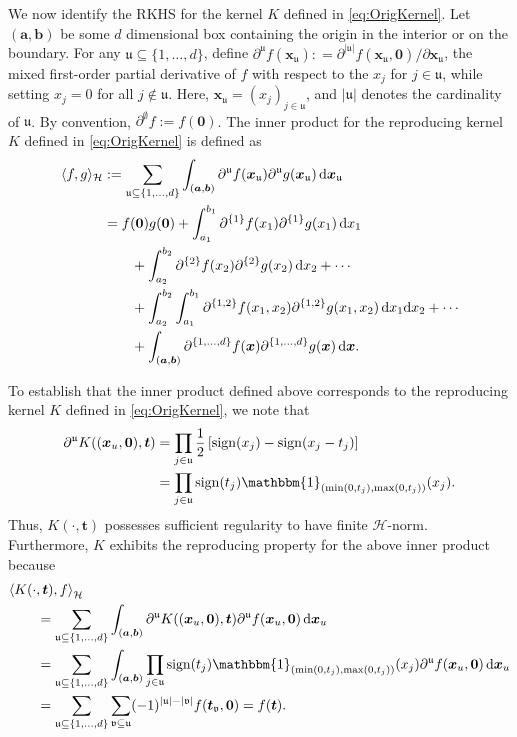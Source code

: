 \documentclass[graybox]{svmult}
\newcommand{\va}{\boldsymbol{a}}
\newcommand{\vb}{\boldsymbol{b}}
\newcommand{\vx}{\boldsymbol{x}}
\newcommand{\vt}{\boldsymbol{t}}
\newcommand{\fraku}{\mathfrak{u}}
\newcommand{\frakv}{\mathfrak{v}}
\newcommand{\vzero}{\boldsymbol{0}}
\newcommand{\dif}{{\rm d}}
\DeclareMathOperator{\sign}{sign}
\newcommand{\ch}{\mathcal{H}}
\newcommand{\bbone}{\mathbbm{1}}
\begin{document}
We now identify the RKHS for the kernel $K$ defined in \eqref{eq:OrigKernel}. Let $(\va,\vb)$ be some $d$ dimensional box containing the origin in the interior or on the boundary. For any $\fraku \subseteq \{1, \ldots, d\}$, define $\partial^\fraku f(\vx_\fraku) : = \partial^{|\fraku|}f(\vx_\fraku,\vzero)/\partial \vx_\fraku$, the mixed first-order partial derivative of $f$ with respect to the $x_j$ for $j\in \fraku$, while setting $x_j=0$ for all $j \notin \fraku$. Here, $\vx_{\fraku} = (x_j)_{j \in \fraku}$, and $|\fraku|$ denotes the cardinality of $\fraku$.  By convention, $\partial^{\emptyset}f := f(\vzero)$.  The inner product for the reproducing kernel $K$ defined in  \eqref{eq:OrigKernel} is defined as 
\begin{align}
\label{eq:inner}
\langle f,g \rangle_{\ch} &:= \sum_{\fraku\subseteq \{1,...,d\}}\int_{(\va,\vb)}\partial^{\fraku}f(\vx_\fraku)\partial^{\fraku}g(\vx_\fraku) \, \dif \vx_\fraku \\
\nonumber
& = f(\vzero)g(\vzero)  + \int_{a_1}^{b_1} \partial^{\{1\}}f(x_1)\partial^{\{1\}}g(x_1) \, \dif x_1 \\
\nonumber 
& \qquad + \int_{a_2}^{b_2} \partial^{\{2\}}f(x_2)\partial^{\{2\}}g(x_2) \, \dif x_2 + \cdots \\
\nonumber 
& \qquad + \int_{a_2}^{b_2} \int_{a_1}^{b_1} \partial^{\{1,2\}}f(x_1,x_2)\partial^{\{1,2\}}g(x_1,x_2) \, \dif x_1 \dif x_2+ \cdots \\
\nonumber 
& \qquad + \int_{(\va,\vb)} \partial^{\{1,\ldots, d\}}f(\vx)\partial^{\{1, \ldots, d\}}g(\vx) \, \dif \vx. 
\end{align}

To establish that the inner product defined above corresponds to the reproducing kernel  $K$ defined in \eqref{eq:OrigKernel}, we note that
\begin{align*}
\partial^{\fraku} K((\vx_u,{\bf 0}),\vt) & =\prod_{j \in \fraku}\frac 12 \left[\sign(x_j) - \sign(x_j - t_j) \right] \\
& =
\prod\limits_{j \in \fraku}\sign(t_j) \bbone_{(\min(0,t_j),\max(0,t_j))}(x_j).
\end{align*}
Thus, $K(\cdot,\vt)$ possesses sufficient regularity to have finite $\ch$-norm.  Furthermore, $K$ exhibits the reproducing property for the above inner product because
\begin{align*}
\MoveEqLeft{\langle K(\cdot,\vt),f \rangle}_{\ch} \\
&= \sum_{\fraku\subseteq \{1,...,d\}}\int_{(\va,\vb)} \partial^{\fraku}K((\vx_u,{\bf 0}),\vt)\partial^{\fraku}f(\vx_u,{\bf 0})  \, \dif \vx_u \\
&= \sum_{\fraku\subseteq \{1,...,d\}}\int_{(\va,\vb)}  \prod\limits_{j \in \fraku}\sign(t_j) \bbone_{(\min(0,t_j),\max(0,t_j))}(x_j) \partial^{\fraku}f(\vx_u,{\bf 0})  \, \dif \vx_u \\
& =     \sum_{\fraku\subseteq \{1,...,d\}}\sum_{\frakv\subseteq \fraku}(-1)^{|\fraku|-|\frakv|}f(\vt_\frakv,{\bf 0})= f(\vt).
\end{align*}
\end{document}
